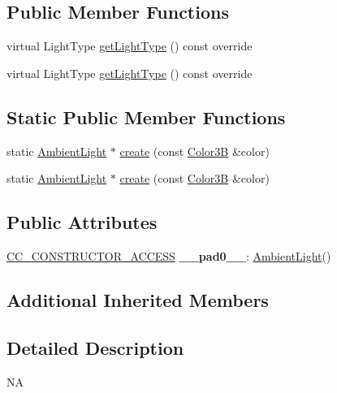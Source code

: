 \subsection*{Public Member Functions}
\begin{DoxyCompactItemize}
\item 
virtual Light\+Type \hyperlink{classAmbientLight_acde40671ef0fa809c5827cf0fefe52a5}{get\+Light\+Type} () const override
\item 
virtual Light\+Type \hyperlink{classAmbientLight_acde40671ef0fa809c5827cf0fefe52a5}{get\+Light\+Type} () const override
\end{DoxyCompactItemize}
\subsection*{Static Public Member Functions}
\begin{DoxyCompactItemize}
\item 
static \hyperlink{classAmbientLight}{Ambient\+Light} $\ast$ \hyperlink{classAmbientLight_a0182a4fa9a333b108430174233dacddb}{create} (const \hyperlink{structColor3B}{Color3B} \&color)
\item 
static \hyperlink{classAmbientLight}{Ambient\+Light} $\ast$ \hyperlink{classAmbientLight_a2179268c3ccb5b8a9f724129e28e1d47}{create} (const \hyperlink{structColor3B}{Color3B} \&color)
\end{DoxyCompactItemize}
\subsection*{Public Attributes}
\begin{DoxyCompactItemize}
\item 
\mbox{\label{classAmbientLight_a4702023d36acd581d33dd9d01fde918e}} 
\hyperlink{_2cocos2d_2cocos_2base_2ccConfig_8h_a25ef1314f97c35a2ed3d029b0ead6da0}{C\+C\+\_\+\+C\+O\+N\+S\+T\+R\+U\+C\+T\+O\+R\+\_\+\+A\+C\+C\+E\+SS} {\bfseries \+\_\+\+\_\+pad0\+\_\+\+\_\+}\+: \hyperlink{classAmbientLight}{Ambient\+Light}()
\end{DoxyCompactItemize}
\subsection*{Additional Inherited Members}


\subsection{Detailed Description}
NA 

